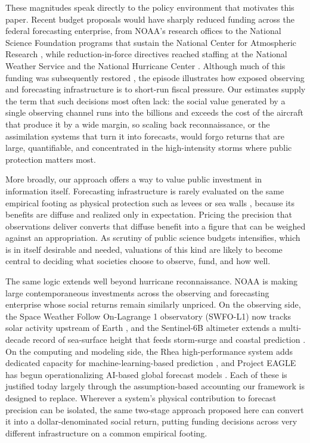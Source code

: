 \documentclass[12pt]{article}%
\begin{document}
These magnitudes speak directly to the policy environment that motivates this paper. Recent budget proposals would have sharply reduced funding across the federal forecasting enterprise, from NOAA's research offices \citep{CRS2026NOAABudget} to the National Science Foundation programs that sustain the National Center for Atmospheric Research \citep{NSF2025BudgetRequest, Science2025NCAR}, while reduction-in-force directives reached staffing at the National Weather Service and the National Hurricane Center \citep{EO14210Workforce2025}. Although much of this funding was subsequently restored \citep{witze2026world}, the episode illustrates how exposed observing and forecasting infrastructure is to short-run fiscal pressure. Our estimates supply the term that such decisions most often lack: the social value generated by a single observing channel runs into the billions and exceeds the cost of the aircraft that produce it by a wide margin, so scaling back reconnaissance, or the assimilation systems that turn it into forecasts, would forgo returns that are large, quantifiable, and concentrated in the high-intensity storms where public protection matters most.

More broadly, our approach offers a way to value public investment in information itself. Forecasting infrastructure is rarely evaluated on the same empirical footing as physical protection such as levees or sea walls \citep{fried2022seawalls}, because its benefits are diffuse and realized only in expectation. Pricing the precision that observations deliver converts that diffuse benefit into a figure that can be weighed against an appropriation. As scrutiny of public science budgets intensifies, which is in itself desirable and needed, valuations of this kind are likely to become central to deciding what societies choose to observe, fund, and how well.

The same logic extends well beyond hurricane reconnaissance. NOAA is making large contemporaneous investments across the observing and forecasting enterprise whose social returns remain similarly unpriced. On the observing side, the Space Weather Follow On-Lagrange 1 observatory (SWFO-L1) now tracks solar activity upstream of Earth \citep{NOAA_SWFOL1_2025}, and the Sentinel-6B altimeter extends a multi-decade record of sea-surface height that feeds storm-surge and coastal prediction \citep{NOAA_Sentinel6B_2025}. On the computing and modeling side, the Rhea high-performance system adds dedicated capacity for machine-learning-based prediction \citep{NOAA_Rhea_2024}, and Project EAGLE has begun operationalizing AI-based global forecast models \citep{NOAA_ProjectEAGLE_2025}. Each of these is justified today largely through the assumption-based accounting our framework is designed to replace. Wherever a system's physical contribution to forecast precision can be isolated, the same two-stage approach proposed here can convert it into a dollar-denominated social return, putting funding decisions across very different infrastructure on a common empirical footing.
\end{document}

